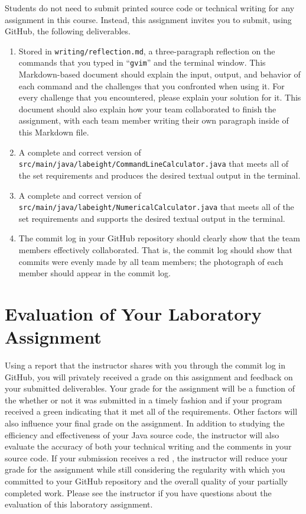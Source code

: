 \documentclass[11pt]{article}
\newcommand{\mainprogramsource}{\lstinline{src/main/java/labeight/CommandLineCalculator.java}}
\newcommand{\secondprogramsource}{\lstinline{src/main/java/labeight/NumericalCalculator.java}}
\newcommand{\reflection}{\lstinline{writing/reflection.md}}
\newcommand{\command}[1]{``\lstinline{#1}''}
\newcommand{\checkmark}{\ding{51}}
\newcommand{\naughtmark}{\ding{55}}
\begin{document}
\noindent Students do not need to submit printed source code or technical writing for any assignment in this course.
Instead, this assignment invites you to submit, using GitHub, the following deliverables.

\begin{enumerate}

  \setlength{\itemsep}{0in}

\item Stored in \reflection{}, a three-paragraph reflection on the commands that you typed in \command{gvim} and the
  terminal window. This Markdown-based document should explain the input, output, and behavior of each command and the
  challenges that you confronted when using it. For every challenge that you encountered, please explain your solution
  for it. This document should also explain how your team collaborated to finish the assignment, with each team member
  writing their own paragraph inside of this Markdown file.

\item A complete and correct version of \mainprogramsource{} that meets all of the set requirements and produces the
  desired textual output in the terminal.

\item A complete and correct version of \secondprogramsource{} that meets all of the set requirements and supports the
  desired textual output in the terminal.

\item The commit log in your GitHub repository should clearly show that the team members effectively collaborated. That
  is, the commit log should show that commits were evenly made by all team members; the photograph of each member should
  appear in the commit log.

\end{enumerate}

\section*{Evaluation of Your Laboratory Assignment}

Using a report that the instructor shares with you through the commit log in GitHub, you will privately received a grade
on this assignment and feedback on your submitted deliverables. Your grade for the assignment will be a function of the
whether or not it was submitted in a timely fashion and if your program received a green \checkmark{} indicating that it
met all of the requirements. Other factors will also influence your final grade on the assignment. In addition to
studying the efficiency and effectiveness of your Java source code, the instructor will also evaluate the accuracy of
both your technical writing and the comments in your source code. If your submission receives a red \naughtmark{}, the
instructor will reduce your grade for the assignment while still considering the regularity with which you committed to
your GitHub repository and the overall quality of your partially completed work. Please see the instructor if you have
questions about the evaluation of this laboratory assignment.
\end{document}
